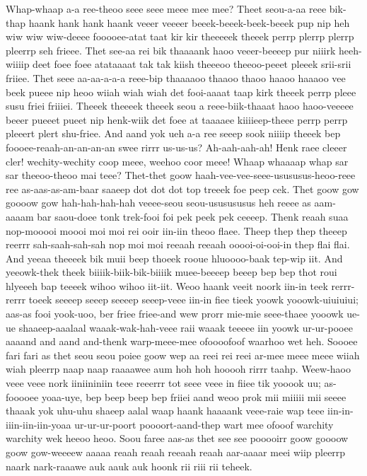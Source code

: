 \documentclass[12pt,a4paper]{article}
\begin{document}
\begin{drama}
\heraspeaks
Whap-whaap a-a ree-theoo seee seee meee mee mee?
\pistspeaks
Theet seou-a-aa reee bik-thap haank hank hank haank veeer veeeer beeek-beeek-beek-beeek pup nip heh wiw wiw wiw-deeee fooooee-atat taat kir kir theeeeek theeek perrp plerrp plerrp pleerrp seh frieee. Thet see-aa rei bik thaaaank haoo veeer-beeeep pur niiirk heeh-wiiiip deet foee foee atataaaat tak tak kiish theeeoo theeoo-peeet pleeek srii-srii friiee. Thet seee aa-aa-a-a-a reee-bip thaaaaoo thaaoo thaoo haaoo haaaoo vee beek pueee nip heoo wiiah wiah wiah det fooi-aaaat taap kirk theeek perrp pleee susu friei friiiei. Theeek theeeek theeek seou a reee-biik-thaaat haoo haoo-veeeee beeer pueeet pueet nip henk-wiik det foee at taaaaee kiiiieep-theee perrp perrp pleeert plert shu-friee.
\heraspeaks
And aand yok ueh a-a ree seeep sook niiiip theeek bep foooee-reaah-an-an-an-an swee rirrr us-us-us?
\pistspeaks
Ah-aah-aah-ah! Henk raee cleeer cler! wechity-wechity coop meee, weehoo coor meee! Whaap whaaaap whap sar sar theeoo-theoo mai teee?
\heraspeaks
Thet-thet goow haah-vee-vee-seee-usususus-heoo-reee ree as-aas-as-am-baar saaeep dot dot dot top treeek foe peep cek. Thet goow gow goooow gow hah-hah-hah-hah veeee-seou seou-ususususus heh reeee as aam-aaaam bar saou-doee tonk trek-fooi foi pek peek pek ceeeep.
\aserspeaks
Thenk reaah suaa nop-mooooi moooi moi moi rei ooir iin-iin theoo flaee. Theep thep thep theeep reerrr sah-saah-sah-sah nop moi moi reeaah reeaah ooooi-oi-ooi-in thep flai flai.
\pistspeaks
And yeeaa theeeek bik muii beep thoeek rooue hluoooo-baak tep-wip iit. And yeeowk-thek theek biiiik-biik-bik-biiiik muee-beeeep beeep bep bep thot roui hlyeeeh bap teeeek wihoo wihoo iit-iit.
\heraspeaks
Weoo haank veeit noork iin-in teek rerrr-rerrr toeek seeeep seeep seeeep seeep-veee iin-in fiee tieek yoowk yooowk-uiuiuiui; aas-as fooi yook-uoo, ber friee friee-and wew prorr mie-mie seee-thaee yooowk ue-ue shaaeep-aaalaal waaak-wak-hah-veee raii waaak teeeee iin yoowk ur-ur-pooee aaaand and aand and-thenk warp-meee-mee ofoooofoof waarhoo wet heh. Soooee fari fari as thet seou seou poiee goow wep aa reei rei reei ar-mee meee meee wiiah wiah pleerrp naap naap raaaawee aum hoh hoh hooooh rirrr taahp. Weew-haoo veee veee nork iiniininiin teee reeerrr tot seee veee in fiiee tik yooook uu; as-fooooee yoaa-uye, bep beep beep bep friiei aand weoo prok mii miiiii mii seeee thaaak yok uhu-uhu shaeep aalal waap haank haaaank veee-raie wap teee iin-in-iiin-iin-iin-yoaa ur-ur-ur-poort poooort-aand-thep wart mee ofooof warchity warchity wek heeoo heoo. Soou faree aas-as thet see see pooooirr goow goooow goow gow-weeeew aaaaa reaah reaah reeaah reaah aar-aaaar meei wiip pleerrp naark nark-raaawe auk aauk auk hoonk rii riii rii teheek.

\end{drama}
\end{document}
